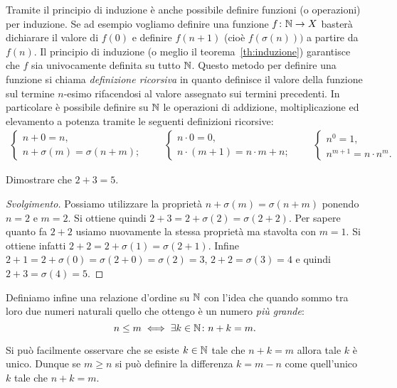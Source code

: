Tramite il principio di induzione è anche possibile 
definire funzioni (o operazioni) per induzione.
Se ad esempio vogliamo definire una funzione $f\colon {\mathbb N}\to X$
basterà dichiarare il valore di $f(0)$ e definire $f(n+1)$ 
(cioè $f(\sigma(n)))$ a partire da $f(n)$.
Il principio di induzione (o meglio il teorema~\ref{th:induzione})
garantisce che $f$ sia univocamente definita su tutto ${\mathbb N}$.
Questo metodo per definire una funzione si chiama 
\emph{definizione ricorsiva} in quanto definisce 
il valore della funzione sul termine $n$-esimo rifacendosi
al valore assegnato sui termini precedenti.
In particolare è possibile definire
su ${\mathbb N}$ le operazioni di addizione, 
moltiplicazione ed elevamento a potenza
tramite le seguenti definizioni ricorsive:
%
%
%
\begin{gather*}
  \begin{cases}
    n + 0 = n,\\
    n + \sigma(m) = \sigma(n+m);
  \end{cases}
  \qquad
  \begin{cases}
    n \cdot 0 = 0,\\
    n \cdot (m+1) = n\cdot m + n;
  \end{cases}
  \qquad
  \begin{cases}
    n^0 = 1,\\
    n^{m+1} = n\cdot n^m.
  \end{cases}
\end{gather*}

\begin{example}
  Dimostrare che $2+3=5$.
\end{example}  
%
\begin{proof}[Svolgimento]
Possiamo utilizzare 
la proprietà $n+\sigma(m) = \sigma(n+m)$ ponendo $n=2$ e $m=2$.
Si ottiene quindi $2+3 = 2+\sigma(2) = \sigma(2+2)$.
Per sapere quanto fa $2+2$ usiamo nuovamente la stessa proprietà 
ma stavolta con $m=1$. 
Si ottiene infatti $2+2=2+\sigma(1)=\sigma(2+1)$.
Infine $2+1=2+\sigma(0)=\sigma(2+0) = \sigma(2) = 3$, 
$2+2=\sigma(3)=4$ e quindi $2+3 = \sigma(4)=5$.
\end{proof}

Definiamo infine una relazione d'ordine su ${\mathbb N}$ 
con l'idea che quando sommo tra loro due numeri naturali 
quello che ottengo è un numero \emph{più grande}:
%
\[
   n\le m \iff \exists k\in {\mathbb N} \colon n+k = m.
\]

Si può facilmente osservare che se esiste $k\in {\mathbb N}$ tale che $n+k=m$
allora tale $k$ è unico. 
Dunque se $m\ge n$ si può definire la differenza $k=m-n$
come quell'unico $k$ tale che $n+k=m$.

